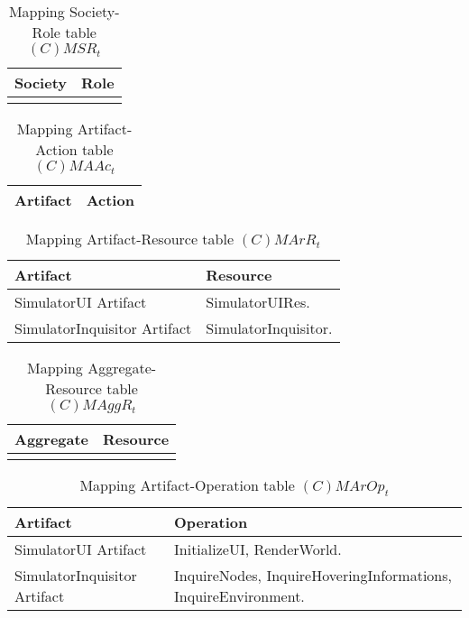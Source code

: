 \begin{table}[H]
	\centering
	\begin{tabular}{|p{4cm}|p{8cm}|}
			\hline
			\textbf{Society} & \textbf{Role} \\
			\hline
			& \\
			\hline
		\end{tabular}
	\caption{Mapping Society-Role table $(C)MSR_t$}
	\label{tab:cmsrt}
\end{table}

\begin{table}[H]
	\centering
	\begin{tabular}{|p{4cm}|p{8cm}|}
			\hline
			\textbf{Artifact} & \textbf{Action} \\
			\hline
			\hline
		\end{tabular}
	\caption{Mapping Artifact-Action table $(C)MAAc_t$}
	\label{tab:cmaact}
\end{table}

\begin{table}[H]
	\centering
	\begin{tabular}{|p{4cm}|p{8cm}|}
			\hline
			\textbf{Artifact} & \textbf{Resource} \\
			\hline
			SimulatorUI Artifact & SimulatorUIRes. \\
			\hline
			SimulatorInquisitor Artifact & SimulatorInquisitor. \\
			\hline
		\end{tabular}
	\caption{Mapping Artifact-Resource table $(C)MArR_t$}
	\label{tab:cmarrt}
\end{table}

\begin{table}[H]
	\centering
	\begin{tabular}{|p{4cm}|p{8cm}|}
			\hline
			\textbf{Aggregate} & \textbf{Resource} \\
			\hline
			& \\
			\hline
		\end{tabular}
	\caption{Mapping Aggregate-Resource table $(C)MAggR_t$}
	\label{tab:cmaggrt}
\end{table}

\begin{table}[H]
	\centering
	\begin{tabular}{|p{4cm}|p{8cm}|}
			\hline
			\textbf{Artifact} & \textbf{Operation} \\
			\hline
			SimulatorUI Artifact & InitializeUI, RenderWorld. \\
			\hline
			SimulatorInquisitor Artifact & InquireNodes, InquireHoveringInformations,
			InquireEnvironment. \\
			\hline
		\end{tabular}
	\caption{Mapping Artifact-Operation table $(C)MArOp_t$}
	\label{tab:cmaropt}
\end{table}

